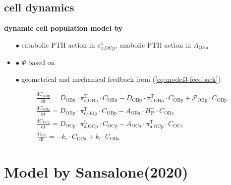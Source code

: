 \documentclass[%
aspectratio=169,  %
]{beamer}
\begin{document}
\subsection{cell dynamics}
\begin{frame}
\textbf{dynamic cell population model by \cite{Lavaill.2020}}
\begin{itemize}
	\item[$\bullet$] catabolic PTH action in $\pi_{\text{a,OCp}}^{\text{L}} $, anabolic PTH action in $A_\text{OBa}$
	\item{$\bullet$} $\Psi$ based on \cite{Lerebours.2016}
	\item[$\bullet$]  geometrical and mechanical feedback from (\ref{eq:model3-feedback})
\end{itemize}
\begin{subequations}
	\begin{align}
		& \frac{\text{d} C_\text{OBp}}{\text{d} t} =  D_\text{OBu} \cdot \pi_{\text{a,OBu}}^\text{T} \cdot C_\text{OBu} -  D_\text{OBp}  \cdot \pi_{\text{r,OBp}}^\text{T} \cdot C_\text{OBp} + \mathcal{P}_\text{OBp} \cdot C_\text{OBp}  \\
		& \frac{\text{d} C_\text{OBa}}{\text{d} t} =   D_\text{OBp}  \cdot  \pi_{\text{r,OBp}}^\text{T} \cdot  C_\text{OBp}-  A_\text{OBa} \cdot H^{-}_\text{P} \cdot C_\text{OBa}\\ 
		& \frac{\text{d} C_\text{OCa}}{\text{d} t} =  D_\text{OCp} \cdot \pi_{\text{a,OCp}}^{\text{L}} \cdot C_\text{OCp} -  A_\text{OCa}   \cdot \pi_{\text{a,OCp}}^\text{T} \cdot C_\text{OCa}  \\
		&\frac{\text{d} f_{bm}}{\text{d} t} = -k_\text{r} \cdot C_\text{OCa} + k_\text{f} \cdot C_\text{OBa} 
	\end{align}
\label{eq:model4}
\end{subequations}
\end{frame}

\section*{Model by Sansalone(2020)}
\end{document}
